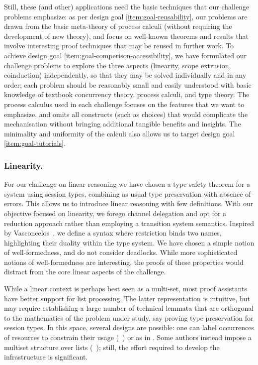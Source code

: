 \documentclass[runningheads]{llncs}
\begin{document}

Still, these (and other) applications need the basic
techniques that our challenge problems emphasize: as per design goal
\ref{item:goal-reusability}, our problems are drawn from the basic
meta-theory of process calculi (without requiring the development of
new theory), and focus on well-known theorems and results that involve
interesting proof techniques that may be reused in further work.  To
achieve design goal \ref{item:goal-comperison-accessibility}, we have
formulated our challenge problems to explore the three aspects
(linearity, scope extrusion, coinduction) independently, so that they
may be solved individually and in any order; each problem should be
reasonably small and easily understood with basic knowledge of
textbook concurrency theory, process calculi, and type theory.  The
process calculus used in each challenge focuses on the features that
we want to emphasize, and omits all constructs (such as choices) that
would complicate the mechanisation without bringing additional
tangible benefits and insights.  The minimality and uniformity of the
calculi also allows us to target design goal
\ref{item:goal-tutorials}.

\subsubsection{Linearity.}

For our challenge on linear reasoning we have chosen a type safety theorem
for a system using session types, combining as usual type preservation with absence of errors.
This allows us to introduce linear reasoning with few definitions.
With our objective focused on linearity, we forego channel delegation
and opt for a reduction approach rather than employing a transition
system semantics.  Inspired by Vasconcelos~\cite{Vasconcelos2012}, we
define a syntax where restriction binds two names, highlighting
their duality within the type system.  We have chosen a simple notion
of well-formedness, and do not  consider
deadlocks. While more sophisticated notions of well-formedness are
interesting, the proofs of these properties would distract from the
core linear aspects of the challenge.

While a linear context is perhaps best seen as a multi-set, most proof assistants have better support for list processing.
The latter representation is intuitive, but may require establishing a large number of technical lemmata that are orthogonal to the mathematics of the problem under study, say proving type preservation for session types.
In this space, several designs are possible: one can label occurrences of resources to constrain their usage (\eg~\cite{CicconeP20}) or  as in \cite{Castro2020}.
Some authors instead impose a multiset structure over lists (\eg~\cite{ChaudhuriLR19,Danielsson12}); still, the effort required to develop the infrastructure is significant.
\end{document}
